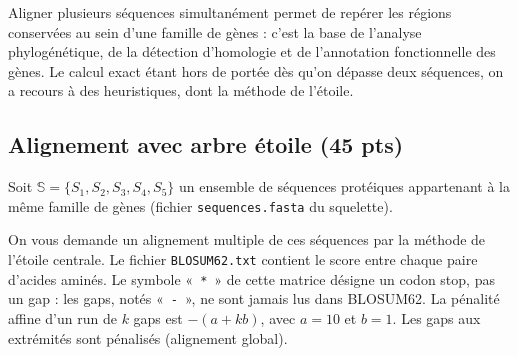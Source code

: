 \documentclass[12pt]{article}
\begin{document}
Aligner plusieurs séquences simultanément permet de repérer les régions conservées au sein d'une famille de gènes : c'est la base de l'analyse phylogénétique, de la détection d'homologie et de l'annotation fonctionnelle des gènes. Le calcul exact étant hors de portée dès qu'on dépasse deux séquences, on a recours à des heuristiques, dont la méthode de l'étoile.

\subsection*{Alignement avec arbre étoile (45 pts)}

Soit $\mathbb{S} = \{S_1, S_2, S_3, S_4, S_5\}$ un ensemble de séquences protéiques appartenant à la même famille de gènes (fichier \texttt{sequences.fasta} du squelette).

On vous demande un alignement multiple de ces séquences par la méthode de l'étoile centrale. Le fichier \texttt{BLOSUM62.txt} contient le score entre chaque paire d'acides aminés. Le symbole «~\texttt{*}~» de cette matrice désigne un codon stop, pas un gap : les gaps, notés «~\texttt{-}~», ne sont jamais lus dans BLOSUM62. La pénalité affine d'un run de $k$ gaps est $-(a + kb)$, avec $a = 10$ et $b = 1$. Les gaps aux extrémités sont pénalisés (alignement global).
\end{document}
